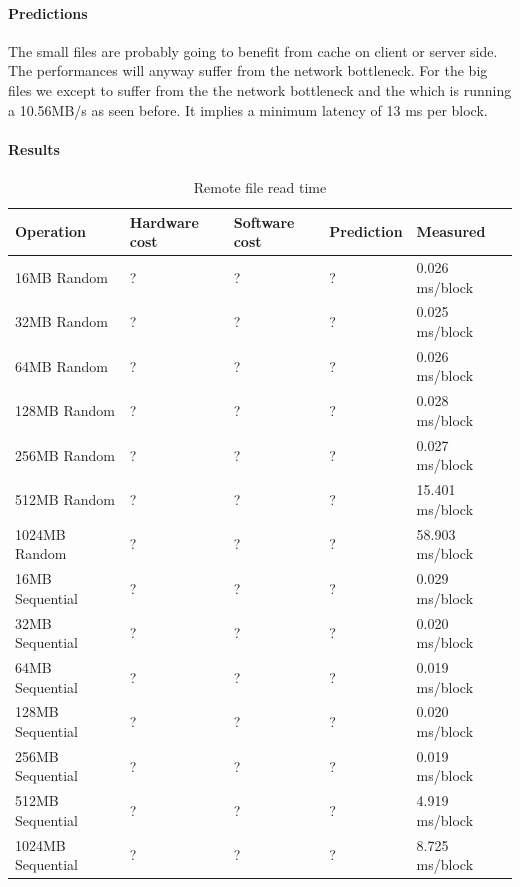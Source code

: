 \paragraph{Predictions}
The small files are probably going to benefit from cache on client or server
side.
The performances will anyway suffer from the network bottleneck.
For the big files we except to suffer from the the network bottleneck and the
which is running a 10.56MB/s as seen before.
It implies a minimum latency of 13 ms per block.

\paragraph{Results}

\begin{table}[h]
\begin{center}
\begin{tabular}{| l | l | l | l | l |}
\hline
Operation & Hardware cost & Software cost & Prediction & Measured \\
\hline

16MB Random		& ?		& ?       & ?        & 0.026   ms/block \\ \hline
32MB Random		& ?		& ?       & ?        & 0.025   ms/block \\ \hline
64MB Random		& ?		& ?       & ?        & 0.026   ms/block \\ \hline
128MB Random 		& ?		& ?       & ?        & 0.028   ms/block \\ \hline
256MB Random		& ?		& ?       & ?        & 0.027   ms/block \\ \hline
512MB Random		& ?		& ?       & ?        & 15.401   ms/block \\ \hline
1024MB Random		& ?		& ?       & ?        & 58.903   ms/block \\ \hline\hline

16MB Sequential	& ?		& ?       & ?        & 0.029    ms/block \\ \hline
32MB Sequential	& ?		& ?       & ?        & 0.020    ms/block \\ \hline
64MB Sequential	& ?		& ?       & ?        & 0.019    ms/block \\ \hline
128MB Sequential 	& ?		& ?       & ?        & 0.020    ms/block \\ \hline
256MB Sequential	& ?		& ?       & ?        & 0.019    ms/block \\ \hline
512MB Sequential	& ?		& ?       & ?        & 4.919    ms/block \\ \hline
1024MB Sequential	& ?		& ?       & ?        & 8.725    ms/block \\ \hline\hline 

\end{tabular}
\end{center}
\caption{Remote file read time\label{tab:remote-file-access}}
\end{table}

